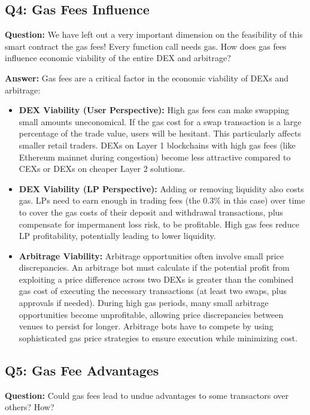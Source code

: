 \documentclass[12pt]{article}
\begin{document}
\subsection{Q4: Gas Fees Influence}
\textbf{Question:} We have left out a very important dimension on the feasibility of this smart contract the gas fees! Every function call needs gas. How does gas fees influence economic viability of the entire DEX and arbitrage?

\textbf{Answer:} Gas fees are a critical factor in the economic viability of DEXs and arbitrage:
\begin{itemize}
    \item \textbf{DEX Viability (User Perspective):} High gas fees can make swapping small amounts uneconomical. If the gas cost for a swap transaction is a large percentage of the trade value, users will be hesitant. This particularly affects smaller retail traders. DEXs on Layer 1 blockchains with high gas fees (like Ethereum mainnet during congestion) become less attractive compared to CEXs or DEXs on cheaper Layer 2 solutions.
    \item \textbf{DEX Viability (LP Perspective):} Adding or removing liquidity also costs gas. LPs need to earn enough in trading fees (the 0.3\% in this case) over time to cover the gas costs of their deposit and withdrawal transactions, plus compensate for impermanent loss risk, to be profitable. High gas fees reduce LP profitability, potentially leading to lower liquidity.
    \item \textbf{Arbitrage Viability:} Arbitrage opportunities often involve small price discrepancies. An arbitrage bot must calculate if the potential profit from exploiting a price difference across two DEXs is greater than the combined gas cost of executing the necessary transactions (at least two swaps, plus approvals if needed). During high gas periods, many small arbitrage opportunities become unprofitable, allowing price discrepancies between venues to persist for longer. Arbitrage bots have to compete by using sophisticated gas price strategies to ensure execution while minimizing cost.
\end{itemize}

\subsection{Q5: Gas Fee Advantages}
\textbf{Question:} Could gas fees lead to undue advantages to some transactors over others? How?
\end{document}
